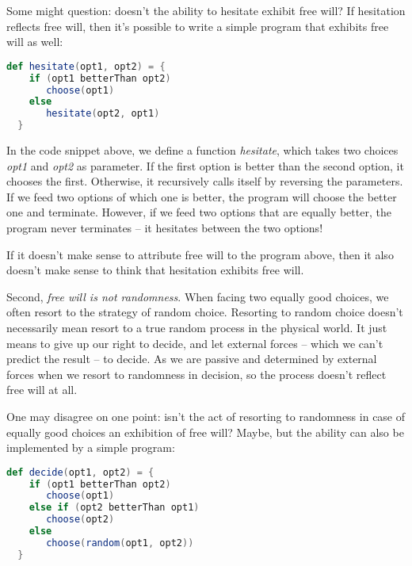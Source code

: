 Some might question: doesn't the ability to hesitate exhibit free will? If hesitation reflects free will, then it's possible to write a simple program that exhibits free will as well:

\begin{lstlisting}[language=Scala]
  def hesitate(opt1, opt2) = {
    if (opt1 betterThan opt2)
       choose(opt1)
    else
       hesitate(opt2, opt1)
  }
\end{lstlisting}

In the code snippet above, we define a function \emph{hesitate}, which takes two choices \emph{opt1} and \emph{opt2} as parameter. If the first option is better than the second option, it chooses the first. Otherwise, it recursively calls itself by reversing the parameters. If we feed two options of which one is better, the program will choose the better one and terminate. However, if we feed two options that are equally better, the program never terminates -- it hesitates between the two options!


If it doesn't make sense to attribute free will to the program above, then it also doesn't make sense to think that hesitation exhibits free will.

Second, \emph{free will is not randomness}. When facing two equally good choices, we often resort to the strategy of random choice. Resorting to random choice doesn't necessarily mean resort to a true random process in the physical world. It just means to give up our right to decide, and let external forces -- which we can't predict the result -- to decide. As we are passive and determined by external forces when we resort to randomness in decision, so the process doesn't reflect free will at all.

One may disagree on one point: isn't the act of resorting to randomness in case of equally good choices an exhibition of free will? Maybe, but the ability can also be implemented by a simple program:

\begin{lstlisting}[language=Scala]
  def decide(opt1, opt2) = {
    if (opt1 betterThan opt2)
       choose(opt1)
    else if (opt2 betterThan opt1)
       choose(opt2)
    else
       choose(random(opt1, opt2))
  }
\end{lstlisting}

